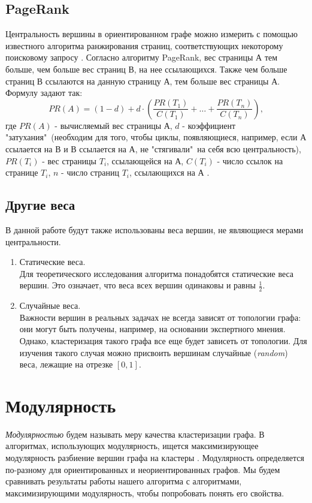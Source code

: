 	\subsection{PageRank}
	Центральность вершины в ориентированном графе можно измерить с помощью известного алгоритма ранжирования страниц, соответствующих некоторому поисковому запросу \cite{pagerankcent}. Согласно алгоритму PageRank, вес страницы А тем больше, чем больше вес страниц В, на нее ссылающихся. Также чем больше страниц В ссылаются на данную страницу А, тем больше вес страницы А. Формулу задают так:
	\begin{equation}
	PR(A)=(1-d)+d\cdot (\frac{PR(T_1)}{C(T_1)}+\dots+\frac{PR(T_n)}{C(T_n)}),
	\end{equation}
	где $PR(A)$ - вычисляемый вес страницы А, $d$ - коэффициент "затухания"\ (необходим для того, чтобы циклы, появляющиеся, например, если А ссылается на В и В ссылается на А, не "стягивали"\ на себя всю центральность), $PR(T_i)$ - вес страницы $T_i$, ссылающейся на А, $C(T_i)$ - число ссылок на странице $T_i$, $n$ - число страниц $T_i$, ссылающихся на А \cite{pagerank}.
	
	\subsection{Другие веса}
	В данной работе будут также использованы веса вершин, не являющиеся мерами центральности.
	
	\begin{enumerate}
		\item Статические веса.\\
		Для теоретического исследования алгоритма понадобятся статические веса вершин. Это означает, что веса всех вершин одинаковы и равны $\frac{1}{2}$.
		
		\item Случайные веса.\\
		Важности вершин в реальных задачах не всегда зависят от топологии графа: они могут быть получены, например, на основании экспертного мнения. Однако, кластеризация такого графа все еще будет зависеть от топологии. Для изучения такого случая можно присвоить вершинам случайные (\textit{random}) веса, лежащие на отрезке $[0,1]$.
	\end{enumerate}

\section{Модулярность}
\textit{Модулярностью} будем называть меру качества кластеризации графа. В алгоритмах, использующих модулярность, ищется максимизирующее модулярность разбиение вершин графа на кластеры \cite{modularity}. Модулярность определяется по-разному для ориентированных и неориентированных графов. Мы будем сравнивать результаты работы нашего алгоритма с алгоритмами, максимизирующими модулярность, чтобы попробовать понять его свойства.\\

